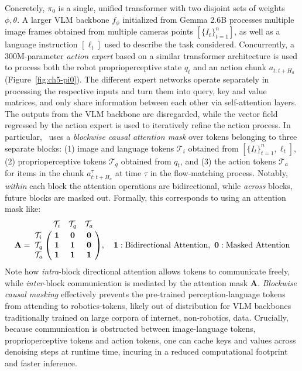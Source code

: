 Concretely, \( \pi_0 \) is a single, unified transformer with two disjoint sets of weights \( \phi, \theta\). 
A larger VLM backbone \( f_\phi \) initialized from Gemma 2.6B processes multiple image frames obtained from multiple cameras points \( [\{ I_t \}_{t=1}^n] \), as well as a language instruction \([\ell_t]\) used to describe the task considered.
Concurrently, a 300M-parameter \emph{action expert} based on a similar transformer architecture is used to process both the robot proprioperceptive state \(q_t\) and an action chunk \(a_{t:t+H_a}\) (Figure~\ref{fig:ch5-pi0}).
The different expert networks operate separately in processing the respective inputs and turn them into query, key and value matrices, and only share information between each other via self-attention layers.
The outputs from the VLM backbone are disregarded, while the vector field regressed by the action expert is used to iteratively refine the action process.
In particular, \pizero~uses a \emph{blockwise causal attention mask} over tokens belonging to three separate blocks: (1) image and language tokens \(\mathcal T_i \)  obtained from \([\{ I_t \}_{t=1}^n, \ell_t]\), (2) proprioperceptive tokens \(\mathcal T_q \) obtained from \(q_t\), and (3) the action tokens \( \mathcal T_a \) for items in the chunk \(a^{\tau}_{t:t+H_a}\) at time \( \tau \) in the flow-matching process.
Notably, \emph{within} each block the attention operations are bidirectional, while \emph{across} blocks, future blocks are masked out.
Formally, this corresponds to using an attention mask like:
\begin{equation*}
    \mathbf{A} =
    \bordermatrix{
              & \mathcal{T}_i & \mathcal{T}_q & \mathcal{T}_a \cr
    \mathcal{T}_i & \mathbf{1} & \mathbf{0} & \mathbf{0} \cr
    \mathcal{T}_q & \mathbf{1} & \mathbf{1} & \mathbf{0} \cr
    \mathcal{T}_a & \mathbf{1} & \mathbf{1} & \mathbf{1} \cr
    },
    \quad \mathbf{1}: \text{Bidirectional Attention}, \ \mathbf{0}: \text{Masked Attention} 
\end{equation*}
Note how \emph{intra}-block directional attention allows tokens to communicate freely, while \emph{inter}-block communication is mediated by the attention mask \(\mathbf{A} \).
\emph{Blockwise causal masking} effectively prevents the pre-trained perception-language tokens from attending to robotics-tokens, likely out of distribution for VLM backbones traditionally trained on large corpora of internet, non-robotics, data.
Crucially, because communication is obstructed between image-language tokens, proprioperceptive tokens and action tokens, one can cache keys and values across denoising steps at runtime time, incuring in a reduced computational footprint and faster inference.

